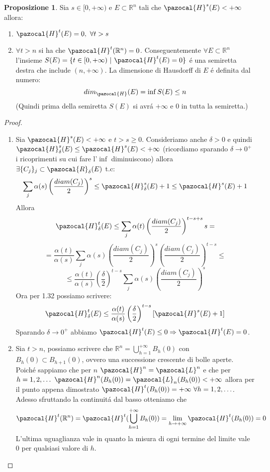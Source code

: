 \documentclass[11pt,a4paper]{report}
\theoremstyle{plain}
\theoremstyle{definition}
\newtheorem{prop}[thm]{Proposizione} %
\newcommand{\Ha}{\pazocal{H}_\delta}
\newcommand{\Hu}{\pazocal{H}}
\newcommand{\Le}{\pazocal{L}}
\begin{document}
\begin{prop}
	Sia $s \in [0, +\infty)$ e $E \subset \mathbb{R}^n$ tali che $\Hu^s(E) < +\infty$ allora:
	\begin{enumerate}
		\item $\Hu^t(E) = 0,\ \forall t > s$
		\item $\forall t > n$ si ha che $\Hu^t(\mathbb{R}^n) = 0$. Conseguentemente $\forall E \subset \mathbb{R}^n$ l'insieme $S(E) = \{t \in [0, +\infty)\ |\ \Hu^t(E) = 0\}$ \'e una semiretta destra che include $(n, +\infty)$. La dimensione di Hausdorff di $E$ \'e definita dal numero:
		\[
			dim_\pazocal{H}(E) = \inf S(E) \le n		
		\]
		(Quindi prima della semiretta $S(E)$ si avr\'a $+\infty$ e $0$ in tutta la semiretta.)
		\end{enumerate}
		\begin{proof}
		\begin{enumerate}
		\item
			Sia $\Hu^s(E) < +\infty$ e $t > s \ge 0$. Consideriamo anche $\delta > 0$ e quindi $\Ha^s(E) \le \Hu^s(E) < + \infty$ (ricordiamo sparando $\delta \rightarrow 0^+$ i ricoprimenti su cui fare l'$\inf$ diminuiscono) allora $\exists \{C_j\}_j \subset \pazocal{R}_\delta(E)$ t.c:
			\begin{equation}
				\sum\limits_j \alpha(s) \left(\frac{diam(C_j)}{2}\right)^s \le \Ha^s(E) + 1 \le \Hu^s(E) + 1
			\end{equation}
			Allora 
			\[
				\Ha^t(E) \le \sum\limits_j \alpha(t) \left(\frac{diam(C_j)}{2}\right)^{t -s + s}s = 
			\]
			\[				
				= \frac{\alpha(t)}{\alpha(s)} \sum\limits_j \alpha(s) \left(\frac{diam(C_j)}{2}\right)^s \left(\frac{diam(C_j)}{2}\right)^{t-s} \le
			\]
			\[
				\le \frac{\alpha(t)}{\alpha(s)} \left(\frac{\delta}{2}\right)^{t-s} \sum\limits_j \alpha(s) \left(\frac{diam(C_j)}{2}\right)^s
			\]
			Ora per 1.32 possiamo scrivere:
			\[
				\Ha^t(E) \le \frac{\alpha(t)}{\alpha(s)} \left(\frac{\delta}{2}\right)^{t-s} [\Hu^s(E) + 1]
			\]
			Sparando $\delta \rightarrow 0^+$ abbiamo $\Hu^t(E) \le 0 \Rightarrow \Hu^t(E) = 0$.
			\item Sia $t > n$, possiamo scrivere che $\mathbb{R}^n = \bigcup\limits_{h=1}^{+\infty} B_h(0)$ con $ B_h(0) \subset  B_{h+1}(0)$, ovvero una successione crescente di bolle aperte.
			Poich\'e sappiamo che per $n$ $\Hu^n = \Le^n$ e che per $h = 1,2,\ldots\ \Hu^n(B_h(0)) = \Le_n(B_h(0)) < +\infty$ allora per il punto appena dimostrato $\Hu^t(B_h(0)) = +\infty\ \forall h=1,2,\ldots$.
			Adesso sfruttando la continuit\'a dal basso otteniamo che 
			\[
				\Hu^t(\mathbb{R}^n) = \Hu^t(\bigcup\limits_{h=1}^{+\infty} B_h(0)) = \lim\limits_{h \rightarrow +\infty}\Hu^t(B_h(0)) = 0
				\]
				L'ultima uguaglianza vale in quanto la misura di ogni termine del limite vale $0$ per qualsiasi valore di $h$.
				\end{enumerate}
		\end{proof}
\end{prop}
\end{document}
